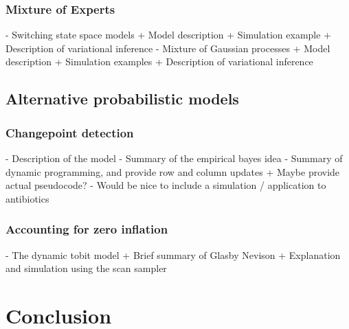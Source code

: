 \documentclass{report}
\begin{document}
\subsection{Mixture of Experts}

- Switching state space models
   + Model description
   + Simulation example
   + Description of variational inference
- Mixture of Gaussian processes
  + Model description
  + Simulation examples
  + Description of variational inference

\section{Alternative probabilistic models}

\subsection{Changepoint detection}

- Description of the model
- Summary of the empirical bayes idea
- Summary of dynamic programming, and provide row and column updates
  + Maybe provide actual pseudocode?
- Would be nice to include a simulation / application to antibiotics

\subsection{Accounting for zero inflation}

- The dynamic tobit model
  + Brief summary of Glasby Nevison
  + Explanation and simulation using the scan sampler

\chapter{Conclusion}



\end{document}
